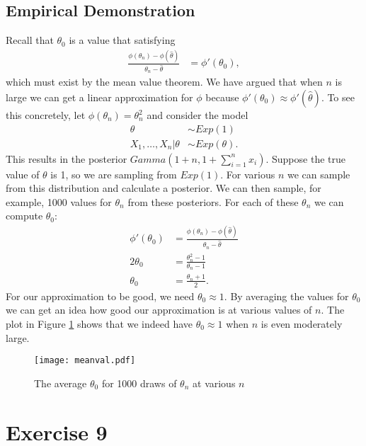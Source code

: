 \documentclass[a4paper,10pt]{article}
\begin{document}
\subsection{Empirical Demonstration}
Recall that $\theta_{0}$ is a value that satisfying
\begin{align*}
\frac{\phi(\theta_{n})-\phi(\hat{\theta})}{\theta_{n} - \hat{\theta}} &= \phi'(\theta_{0}),
\end{align*}
which must exist by the mean value theorem.  We have argued that when $n$ is large we can get a linear approximation for $\phi$ because $\phi'(\theta_{0}) \approx \phi'(\hat{\theta})$.  To see this concretely, let $\phi(\theta_{n})=\theta_{n}^{2}$ and consider the model
\begin{align*}
\theta &\sim Exp(1) \\
X_{1}, \ldots, X_{n}|\theta &\sim Exp(\theta).
\end{align*}
This results in the posterior $Gamma(1+n,1+\sum_{i=1}^{n}x_{i})$.  Suppose the true value of $\theta$ is 1, so we are sampling from $Exp(1)$.  For various $n$ we can sample from this distribution and calculate a posterior.  We can then sample, for example, 1000 values for $\theta_{n}$ from these posteriors.  For each of these $\theta_{n}$ we can compute $\theta_{0}$:
\begin{align*}
\phi'(\theta_{0}) &=  \frac{\phi(\theta_{n})-\phi(\hat{\theta})}{\theta_{n} - \hat{\theta}} \\
2\theta_{0} &= \frac{\theta_{n}^{2}-1}{\theta_{n}-1} \\
\theta_{0} &= \frac{\theta_{n}+1}{2}.
\end{align*}
For our approximation to be good, we need $\theta_{0} \approx 1$.  By averaging the values for $\theta_{0}$ we can get an idea how good our approximation is at various values of $n$.  The plot in Figure \ref{meanval} shows that we indeed have $\theta_{0} \approx 1$ when $n$ is even moderately large.
\begin{figure}
\centering
\texttt{[image: meanval.pdf]}
\caption{\label{meanval} The average $\theta_{0}$ for 1000 draws of $\theta_{n}$ at various $n$}
\end{figure}

\section{Exercise 9}
\end{document}
